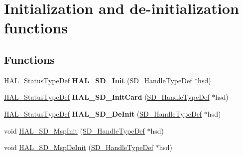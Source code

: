 \hypertarget{group___s_d___exported___functions___group1}{}\section{Initialization and de-\/initialization functions}
\label{group___s_d___exported___functions___group1}
\subsection*{Functions}
\begin{DoxyCompactItemize}
\item 
\mbox{\label{group___s_d___exported___functions___group1_gae810ba97b6cdbcb565e09a2bff888540}} 
\mbox{\hyperlink{stm32f7xx__hal__def_8h_a63c0679d1cb8b8c684fbb0632743478f}{H\+A\+L\+\_\+\+Status\+Type\+Def}} {\bfseries H\+A\+L\+\_\+\+S\+D\+\_\+\+Init} (\mbox{\hyperlink{group___s_d___exported___types___group3_ga1f31eb64a86b0c740bb5c02fa4c9914d}{S\+D\+\_\+\+Handle\+Type\+Def}} $\ast$hsd)
\item 
\mbox{\label{group___s_d___exported___functions___group1_ga2e71b088bca019b0a7e44016ca1e1707}} 
\mbox{\hyperlink{stm32f7xx__hal__def_8h_a63c0679d1cb8b8c684fbb0632743478f}{H\+A\+L\+\_\+\+Status\+Type\+Def}} {\bfseries H\+A\+L\+\_\+\+S\+D\+\_\+\+Init\+Card} (\mbox{\hyperlink{group___s_d___exported___types___group3_ga1f31eb64a86b0c740bb5c02fa4c9914d}{S\+D\+\_\+\+Handle\+Type\+Def}} $\ast$hsd)
\item 
\mbox{\label{group___s_d___exported___functions___group1_ga6bba9fce639c7d476dbd443b8c9e3117}} 
\mbox{\hyperlink{stm32f7xx__hal__def_8h_a63c0679d1cb8b8c684fbb0632743478f}{H\+A\+L\+\_\+\+Status\+Type\+Def}} {\bfseries H\+A\+L\+\_\+\+S\+D\+\_\+\+De\+Init} (\mbox{\hyperlink{group___s_d___exported___types___group3_ga1f31eb64a86b0c740bb5c02fa4c9914d}{S\+D\+\_\+\+Handle\+Type\+Def}} $\ast$hsd)
\item 
void \mbox{\hyperlink{group___s_d___exported___functions___group1_ga11b692d44079cb65eb037202d627ae96}{H\+A\+L\+\_\+\+S\+D\+\_\+\+Msp\+Init}} (\mbox{\hyperlink{group___s_d___exported___types___group3_ga1f31eb64a86b0c740bb5c02fa4c9914d}{S\+D\+\_\+\+Handle\+Type\+Def}} $\ast$hsd)
\item 
void \mbox{\hyperlink{group___s_d___exported___functions___group1_gaad3ad0f8145fca4a29dbe8beef5db085}{H\+A\+L\+\_\+\+S\+D\+\_\+\+Msp\+De\+Init}} (\mbox{\hyperlink{group___s_d___exported___types___group3_ga1f31eb64a86b0c740bb5c02fa4c9914d}{S\+D\+\_\+\+Handle\+Type\+Def}} $\ast$hsd)
\end{DoxyCompactItemize}


